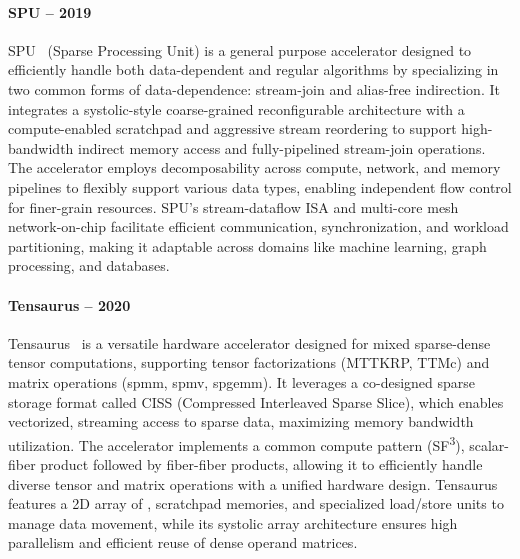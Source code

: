 \paragraph{SPU -- 2019}

SPU~\cite{Dadu2019_SPU} (Sparse Processing Unit) is a general purpose accelerator designed to efficiently handle both data-dependent and regular algorithms by specializing in two common forms of data-dependence: stream-join and alias-free indirection.
It integrates a systolic-style coarse-grained reconfigurable architecture with a compute-enabled scratchpad and aggressive stream reordering to support high-bandwidth indirect memory access and fully-pipelined stream-join operations.
The accelerator employs decomposability across compute, network, and memory pipelines to flexibly support various data types, enabling independent flow control for finer-grain resources.
SPU's stream-dataflow ISA and multi-core mesh network-on-chip facilitate efficient communication, synchronization, and workload partitioning, making it adaptable across domains like machine learning, graph processing, and databases.

\paragraph{Tensaurus -- 2020}

Tensaurus~\cite{Srivastava2020_Tensaurus} is a versatile hardware accelerator designed for mixed sparse-dense tensor computations, supporting tensor factorizations (\eg MTTKRP, TTMc) and matrix operations (\eg \acrshort{spmm}, \acrshort{spmv}, \acrshort{spgemm}).
It leverages a co-designed sparse storage format called CISS (Compressed Interleaved Sparse Slice), which enables vectorized, streaming access to sparse data, maximizing memory bandwidth utilization.
The accelerator implements a common compute pattern (SF\textsuperscript{3}), scalar-\gls{fiber} product followed by \gls{fiber}-\gls{fiber} products, allowing it to efficiently handle diverse tensor and matrix operations with a unified hardware design.
Tensaurus features a 2D array of , scratchpad memories, and specialized load/store units to manage data movement, while its systolic array architecture ensures high parallelism and efficient reuse of dense operand matrices.

